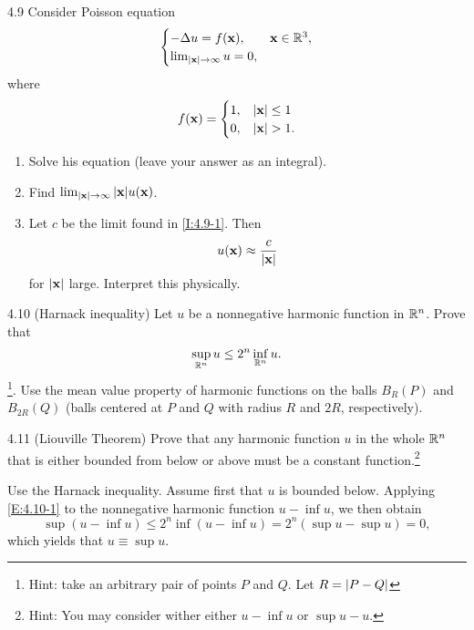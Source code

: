 \begin{question}{4.9 }{}
    Consider Poisson equation
    \[
        \begin{cases}
            -\Delta u = f(\vb{x}), &\vb{x}\in\mathbb{R}^3, \\
            \lim_{\abs{\vb{x}}\to\infty} u = 0, & \\
        \end{cases}
    \]
    where
    \[
        f(\vb{x}) = \begin{cases}
            1, & \abs{\vb{x}}\leq 1 \\
            0, & \abs{\vb{x}} > 1. \\
        \end{cases}
    \]
    \begin{enumerate}[label=(\roman*)]
        \item Solve his equation (leave your answer as an integral).
        \item\label{I:4.9-1} Find $\lim_{\abs{\vb{x}}\to\infty} \abs{\vb{x}}u(\vb{x})$.
        \item Let $c$ be the limit found in \ref{I:4.9-1}. Then
            \[
                u(\vb{x}) \approx \frac{c}{\abs{\vb{x}}}
            \]
            for $\abs{\vb{x}}$ large. Interpret this physically.
    \end{enumerate}
\end{question}


\begin{question}{4.10 (Harnack inequality) }{}
    Let $u$ be a nonnegative harmonic function in $\mathbb{R}^n$. Prove that
    \begin{equation}\label{E:4.10-1}
        \sup_{\mathbb{R}^n} u \leq 2^n\inf_{\mathbb{R}^n} u.
    \end{equation}
    \footnote{Hint: take an arbitrary pair of points $P$ and $Q$. Let $R=\abs{P-Q}$}. Use the mean value property of harmonic functions on the balls $B_R(P)$ and $B_{2R}(Q)$ (balls centered at $P$ and $Q$ with radius $R$ and $2R$, respectively).
\end{question}


\begin{question}{4.11 (Liouville Theorem)}{}
    Prove that any harmonic function $u$ in the whole $\mathbb{R}^n$ that is either bounded from below or above must be a constant function.\footnote{Hint: You may consider wither either $u-\inf u$ or $\sup u-u$.}
\end{question}
Use the Harnack inequality. Assume first that $u$ is bounded below. Applying \eqref{E:4.10-1} to the nonnegative harmonic function $u-\inf u$, we then obtain
\[
    \sup(u-\inf u) \leq 2^n\inf(u-\inf u) = 2^n(\sup u - \sup u) = 0,
\]
which yields that $u\equiv\sup u$.


